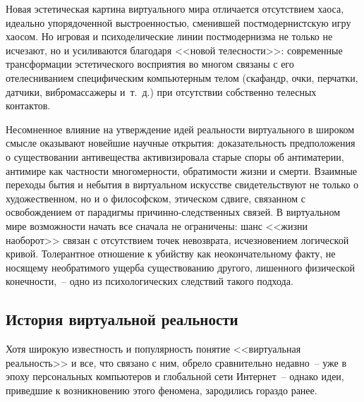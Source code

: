   Новая эстетическая картина виртуального мира отличается отсутствием хаоса,
  идеально упорядоченной выстроенностью, сменившей постмодернистскую игру
  хаосом. Но игровая и психоделические линии постмодернизма не только не
  исчезают, но и усиливаются благодаря <<новой телесности>>: современные
  трансформации эстетического восприятия во многом связаны с его отелесниванием
  специфическим компьютерным телом (скафандр, очки, перчатки, датчики,
  вибромассажеры и~т.~д.) при отсутствии собственно телесных контактов.

  Несомненное влияние на утверждение идей реальности виртуального в широком
  смысле оказывают новейшие научные открытия: доказательность предположения о
  существовании антивещества активизировала старые споры об антиматерии,
  антимире как частности многомерности, обратимости жизни и смерти. Взаимные
  переходы бытия и небытия в виртуальном искусстве свидетельствуют не только о
  художественном, но и о философском, этическом сдвиге, связанном с
  освобождением от парадигмы причинно-следственных связей. В виртуальном мире
  возможности начать все сначала не ограничены: шанс <<жизни наоборот>> связан
  с отсутствием точек невозврата, исчезновением логической кривой. Толерантное
  отношение к убийству как неокончательному факту, не носящему необратимого
  ущерба существованию другого, лишенного физической конечности,~-- одно из
  психологических следствий такого подхода.~\cite{Orlov}

  \subsection{История виртуальной реальности}

  Хотя широкую известность и популярность понятие <<виртуальная реальность>> и
  все, что связано с ним, обрело сравнительно недавно~-- уже в эпоху
  персональных компьютеров и глобальной сети Интернет~-- однако идеи, приведшие
  к возникновению этого феномена, зародились гораздо ранее.
  
